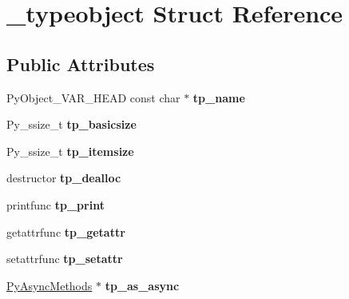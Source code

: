 \hypertarget{struct__typeobject}{}\section{\+\_\+typeobject Struct Reference}
\label{struct__typeobject}
\subsection*{Public Attributes}
\begin{DoxyCompactItemize}
\item 
Py\+Object\+\_\+\+V\+A\+R\+\_\+\+H\+E\+AD const char $\ast$ {\bfseries tp\+\_\+name}\hypertarget{struct__typeobject_ac5e735ef4e5e666b94668cbed5a08901}{}\label{struct__typeobject_ac5e735ef4e5e666b94668cbed5a08901}

\item 
Py\+\_\+ssize\+\_\+t {\bfseries tp\+\_\+basicsize}\hypertarget{struct__typeobject_aede3a7181d6d3c0560c44740b805ac00}{}\label{struct__typeobject_aede3a7181d6d3c0560c44740b805ac00}

\item 
Py\+\_\+ssize\+\_\+t {\bfseries tp\+\_\+itemsize}\hypertarget{struct__typeobject_aa2f823359e194b776476771c4b4a0a99}{}\label{struct__typeobject_aa2f823359e194b776476771c4b4a0a99}

\item 
destructor {\bfseries tp\+\_\+dealloc}\hypertarget{struct__typeobject_a340396d33c324118bdda0a521bf235fb}{}\label{struct__typeobject_a340396d33c324118bdda0a521bf235fb}

\item 
printfunc {\bfseries tp\+\_\+print}\hypertarget{struct__typeobject_a9b6d17094356175c542e007464cae33f}{}\label{struct__typeobject_a9b6d17094356175c542e007464cae33f}

\item 
getattrfunc {\bfseries tp\+\_\+getattr}\hypertarget{struct__typeobject_a08abee6f5a4acecaf660eebadd013d09}{}\label{struct__typeobject_a08abee6f5a4acecaf660eebadd013d09}

\item 
setattrfunc {\bfseries tp\+\_\+setattr}\hypertarget{struct__typeobject_a83b13e804c97dd0941b6531cfd501640}{}\label{struct__typeobject_a83b13e804c97dd0941b6531cfd501640}

\item 
\hyperlink{structPyAsyncMethods}{Py\+Async\+Methods} $\ast$ {\bfseries tp\+\_\+as\+\_\+async}\hypertarget{struct__typeobject_ae28556990c96f295aafa2796ff92d9a6}{}\label{struct__typeobject_ae28556990c96f295aafa2796ff92d9a6}


\end{DoxyCompactItemize}
